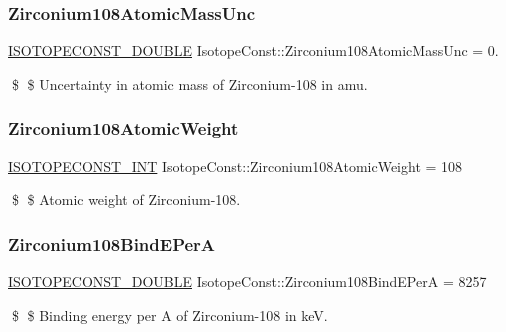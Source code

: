 \subsubsection{\texorpdfstring{Zirconium108\+Atomic\+Mass\+Unc}{Zirconium108AtomicMassUnc}}
{\footnotesize\ttfamily \mbox{\hyperlink{group___isotope_const-_macros_ga8f45a7272ce02c0b4c65c44636ed719a}{I\+S\+O\+T\+O\+P\+E\+C\+O\+N\+S\+T\+\_\+\+D\+O\+U\+B\+LE}} Isotope\+Const\+::\+Zirconium108\+Atomic\+Mass\+Unc = 0.}

\$ \$ Uncertainty in atomic mass of Zirconium-\/108 in amu. \mbox{\label{group___isotope_const-_zirconium-_zr108_gac4d35472c77e71317f239d4aba09b916}} 
\subsubsection{\texorpdfstring{Zirconium108\+Atomic\+Weight}{Zirconium108AtomicWeight}}
{\footnotesize\ttfamily \mbox{\hyperlink{group___isotope_const-_macros_ga5f18360b3e99483a35c32d789e62621c}{I\+S\+O\+T\+O\+P\+E\+C\+O\+N\+S\+T\+\_\+\+I\+NT}} Isotope\+Const\+::\+Zirconium108\+Atomic\+Weight = 108}

\$ \$ Atomic weight of Zirconium-\/108. \mbox{\label{group___isotope_const-_zirconium-_zr108_gaee0e6f77d3d127424e2cfc68be0e0ad4}} 
\subsubsection{\texorpdfstring{Zirconium108\+Bind\+E\+PerA}{Zirconium108BindEPerA}}
{\footnotesize\ttfamily \mbox{\hyperlink{group___isotope_const-_macros_ga8f45a7272ce02c0b4c65c44636ed719a}{I\+S\+O\+T\+O\+P\+E\+C\+O\+N\+S\+T\+\_\+\+D\+O\+U\+B\+LE}} Isotope\+Const\+::\+Zirconium108\+Bind\+E\+PerA = 8257}

\$ \$ Binding energy per A of Zirconium-\/108 in keV. \mbox{\label{group___isotope_const-_zirconium-_zr108_ga8a2e3545b68822d9dc5b6f2645e8ff6d}} 
